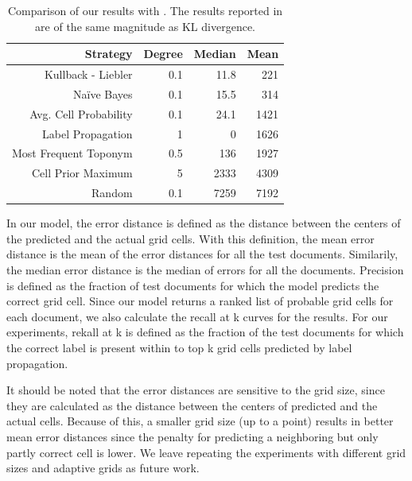 \begin{table}[tbp]
\begin{center}
\begin{tabular}{|r|r|r|r|}
\hline
Strategy & Degree & Median & Mean \\
\hline
Kullback - Liebler & 0.1 & 11.8 & 221 \\
Naïve Bayes & 0.1 & 15.5 & 314 \\
Avg. Cell Probability & 0.1 & 24.1 & 1421 \\
Label Propagation & 1 & 0 &  1626 \\
Most Frequent Toponym &  0.5 &  136 & 1927 \\
Cell Prior Maximum & 5 & 2333 & 4309 \\
Random & 0.1 &7259 & 7192 \\
\hline
\end{tabular}
\caption{Comparison of our results with . The results reported in  are of the same magnitude as KL divergence.}
\label{tab:comparison}
\end{center}
\end{table}


In our model, the error distance is defined as the distance between the
centers of the predicted and the actual grid cells.  With this
definition, the mean error distance is the mean of the error distances for all
the test documents. Similarily, the median error distance is the median of
errors for all the documents.  Precision is defined as the
fraction of test documents for which the model predicts the correct grid cell.
Since our model returns a ranked list of probable grid cells for each
document,  we also
calculate the recall at k curves for the results. For our experiments, rekall
at k is defined as the fraction of the test documents for which the correct
label is present within to top k grid cells predicted by label propagation.

It should be noted that the error distances are sensitive to the grid size,
since they are calculated as the distance between the centers of predicted and
the actual cells. Because of this, a smaller grid size (up to a point) results
in better mean error distances since the penalty for predicting a neighboring
but only partly correct cell is lower. We leave repeating the experiments with
different grid sizes and adaptive grids as future work.


